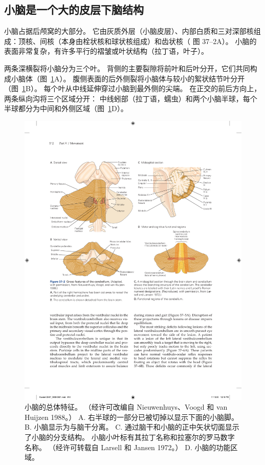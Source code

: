 \subsection{小脑是一个大的皮层下脑结构}

小脑占据后颅窝的大部分。
它由灰质外层（小脑皮层）、内部白质和三对深部核组成：顶核、间核（本身由栓状核和球状核组成）和齿状核（ 图 37–2A）。
小脑的表面非常复杂，有许多平行的褶皱或叶状结构（拉丁语，叶子）。


两条深横裂将小脑分为三个叶。
背侧的主要裂隙将前叶和后叶分开，它们共同构成小脑体（图~\ref{fig:37_2}A）。
腹侧表面的后外侧裂将小脑体与较小的絮状结节叶分开（图~\ref{fig:37_2}B）。
每个叶从中线延伸穿过小脑到最外侧的尖端。
在正交的前后方向上，两条纵向沟将三个区域分开：
中线蚓部（拉丁语，蠕虫）和两个小脑半球，每个半球都分为中间和外侧区域（图~\ref{fig:37_2}D）。


\begin{figure}[htbp]
	\centering
	\includegraphics[width=0.9\linewidth]{chap37/fig_37_2}
	\caption{小脑的总体特征。 （经许可改编自 Nieuwenhuys、Voogd 和 van Huijzen 1988。） A. 右半球的一部分已被切掉以显示下面的小脑脚。 B. 小脑显示为与脑干分离。 C. 通过脑干和小脑的正中矢状切面显示了小脑的分支结构。 小脑小叶标有其拉丁名称和拉塞尔的罗马数字名称。 （经许可转载自 Larsell 和 Jansen 1972。） D. 小脑的功能区域。}
	\label{fig:37_2}
\end{figure}



